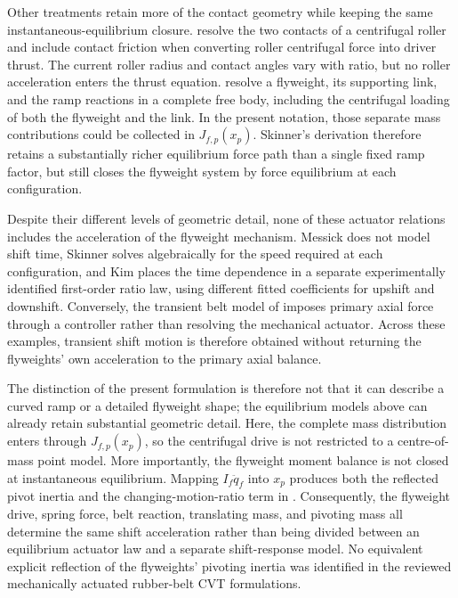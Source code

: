 \documentclass[11pt]{report}
\numberwithin{equation}{section}
\begin{document}
Other treatments retain more of the contact geometry while keeping the same
instantaneous-equilibrium closure. \citet{KimEtAl2002} resolve the two
contacts of a centrifugal roller and include contact friction when converting
roller centrifugal force into driver thrust. The current roller radius and
contact angles vary with ratio, but no roller acceleration enters the thrust
equation. \citet{Skinner2020} resolve a flyweight, its supporting link, and
the ramp reactions in a complete free body, including the centrifugal loading
of both the flyweight and the link. In the present notation, those separate
mass contributions could be collected in \(J_{f,p}(x_p)\). Skinner's
derivation therefore retains a substantially richer equilibrium force path
than a single fixed ramp factor, but still closes the flyweight system by
force equilibrium at each configuration.

Despite their different levels of geometric detail, none of these actuator
relations includes the acceleration of the flyweight mechanism. Messick does
not model shift time, Skinner solves algebraically for the speed required at
each configuration, and Kim places the time dependence in a separate
experimentally identified first-order ratio law, using different fitted
coefficients for upshift and downshift. Conversely, the transient belt model
of \citet{Ballew2015} imposes primary axial force through a controller rather
than resolving the mechanical actuator. Across these examples, transient
shift motion is therefore obtained without returning the flyweights' own
acceleration to the primary axial balance.

The distinction of the present formulation is therefore not that it can
describe a curved ramp or a detailed flyweight shape; the equilibrium models
above can already retain substantial geometric detail. Here, the complete
mass distribution enters through \(J_{f,p}(x_p)\), so the centrifugal drive is
not restricted to a centre-of-mass point model. More importantly, the
flyweight moment balance is not closed at instantaneous equilibrium. Mapping
\(I_f\ddot q_f\) into \(x_p\) produces both the reflected pivot inertia and
the changing-motion-ratio term in
. Consequently, the flyweight drive,
spring force, belt reaction, translating mass, and pivoting mass all determine
the same shift acceleration rather than being divided between an equilibrium
actuator law and a separate shift-response model. No equivalent explicit
reflection of the flyweights' pivoting inertia was identified in the reviewed
mechanically actuated rubber-belt CVT formulations.
\end{document}
